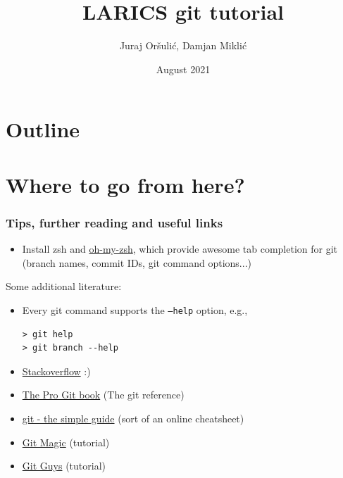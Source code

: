 \documentclass[xcolor=dvipsnames]{beamer}%
\title[git basics]
{LARICS git tutorial}
\author[Or\v{s}uli\'{c}, Mikli\'{c}]{Juraj Or\v{s}uli\'{c}, Damjan Mikli\'{c}}
\institute[LARICS]{LARICS Lab\\University of Zagreb FER}
\date[]{August 2021}
\begin{document}

\begin{frame}
	\titlepage
\end{frame}

\section*{Outline}
\begin {frame}
	\tableofcontents
\end{frame}












\section{Where to go from here?}

\begin{frame}[fragile]

\frametitle{Tips, further reading and useful links}

	\begin{itemize}	
	\item Install zsh and \href{http://ohmyz.sh/}{oh-my-zsh}, which provide awesome tab completion for git (branch names, commit IDs, git command options...)
	\end{itemize}
	
Some additional literature:
	\begin{itemize}
	\item Every git command supports the \texttt{--help} option, e.g.,
	\begin{verbatim}
> git help
> git branch --help
	\end{verbatim}
	\item \href{http://stackoverflow.com/questions/tagged/git}{Stackoverflow} :)
	\item \href{https://git-scm.com/book/en/v2}{The Pro Git book} (The git reference)
	\item \href{http://rogerdudler.github.io/git-guide/}{git - the simple guide} (sort of an online cheatsheet)
	\item \href{http://www-cs-students.stanford.edu/~blynn/gitmagic/}{Git Magic} (tutorial) 
	\item \href{http://www.gitguys.com/}{Git Guys} (tutorial)
	\end{itemize}
	
\end{frame}
\end{document}
